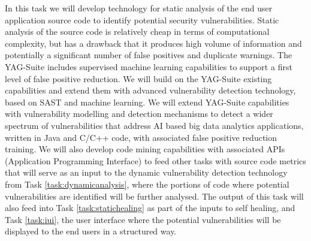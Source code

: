 \begin{Workpackage}{\thewpno}
\begin{Task}
\TaskResults{%
\ref{del:vul1},
\ref{del:vul2},
\ref{del:vul3}
}
\TaskHeader{}
In this task we will develop technology for static analysis of the end user application source code to identify potential security vulnerabilities. Static analysis of the source code is relatively cheap in terms of computational complexity, but has a drawback that it produces high volume of information and potentially a significant number of false positives and duplicate warnings. The YAG-Suite includes supervised machine learning capabilities to support a first level of false positive reduction. We will build on the YAG-Suite existing capabilities and extend them with advanced vulnerability detection technology, based on SAST and machine learning. We will extend YAG-Suite capabilities with vulnerability modelling and detection mechanisms to detect a wider spectrum of vulnerabilities that address AI based big data analytics applications, written in Java and C/C++ code, with associated false positive reduction training. We will also develop code mining capabilities with associated APIs (Application Programming Interface) to feed other tasks with source code metrics that will serve as an input to the dynamic vulnerability detection technology from Task \ref{task:dynamicanalysis}, where the portions of code where potential vulnerabilities are identified will be further analysed. The output of this task will also feed into Task \ref{task:statichealing} as part of the inputs to self healing, and Task \ref{task:iui}, the user interface where the potential vulnerabilities will be displayed to the end users in a structured way. 


\end{Task}
\end{Workpackage}
